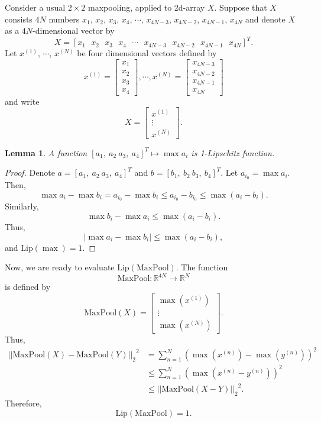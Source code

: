 \documentclass[11pt]{report}
\newtheorem{lemma}{Lemma} %
\newcommand\lip{\ensuremath{\text{Lip}}}
\begin{document}
Consider a usual \(2\times 2\) maxpooling, applied to 2d-array \(X\).
Suppose that \(X\) consists \(4N\) numbers \(x_1\), \(x_2\), \(x_3\), \(x_4\), \(\cdots\), \(x_{4N-3}\), \(x_{4N-2}\), \(x_{4N-1}\), \(x_{4N}\) and denote \(X\) as a \(4N\)-dimensional vector by
\[X=[x_1\:\:\:x_2\:\:\:x_3\:\:\:x_4\:\:\:\cdots\:\:\:x_{4N-3}\:\:\:x_{4N-2}\:\:\:x_{4N-1}\:\:\:x_{4N}]^T.\]
Let \(x^{(1)}\), \(\cdots\), \(x^{(N)}\) be four dimensional vectors defined by
\[x^{(1)}=\begin{bmatrix}x_1\\x_2\\x_3\\x_4\end{bmatrix},\cdots,x^{(N)}=\begin{bmatrix}x_{4N-3}\\x_{4N-2}\\x_{4N-1}\\x_{4N}\end{bmatrix}\]
and write
\[X=\begin{bmatrix}x^{(1)}\\\vdots\\x^{(N)}\end{bmatrix}.\]

\begin{lemma}\label{lemm:maxs_1_lipschitz}
A function \([a_1,\:a_2\:a_3,\:a_4]^T\mapsto\max a_i\) is 1-Lipschitz function.
\end{lemma}
\begin{proof}
Denote \(a=[a_1,\:a_2\:a_3,\:a_4]^T\) and \(b=[b_1,\:b_2\:b_3,\:b_4]^T\).
Let \(a_{i_0}=\max a_i\).
Then,
\[\max a_i-\max b_i=a_{i_0}-\max b_i\le a_{i_0}-b_{i_0}\le\max (a_i-b_i).\]
Similarly, \[\max b_i-\max a_i\le\max (a_i-b_i).\]
Thus,
\[\left|\max a_i-\max b_i\right|\le\max (a_i-b_i),\]
and \(\lip(\max)=1\).
\end{proof}

Now, we are ready to evaluate \(\lip(\text{MaxPool})\).
The function \[\text{MaxPool}:\mathbb R^{4N}\to\mathbb R^N\] is defined by
\[\text{MaxPool}(X)=\begin{bmatrix}\max \left(x^{(1)}\right)\\\vdots\\\max \left(x^{(N)}\right)\end{bmatrix}.\]
Thus,
\begin{align*}
{\left|\left|\text{MaxPool}(X)-\text{MaxPool}(Y)\right|\right|_2}^2
&=\sum_{n=1}^N\left(\max\left(x^{(n)}\right)-\max\left(y^{(n)}\right)\right)^2\\
&\le\sum_{n=1}^N\left(\max\left(x^{(n)}-y^{(n)}\right)\right)^2\\
&{\le\left|\left|\text{MaxPool}(X-Y)\right|\right|_2}^2.
\end{align*}
Therefore,
\[\lip(\text{MaxPool})=1.\]
\end{document}
